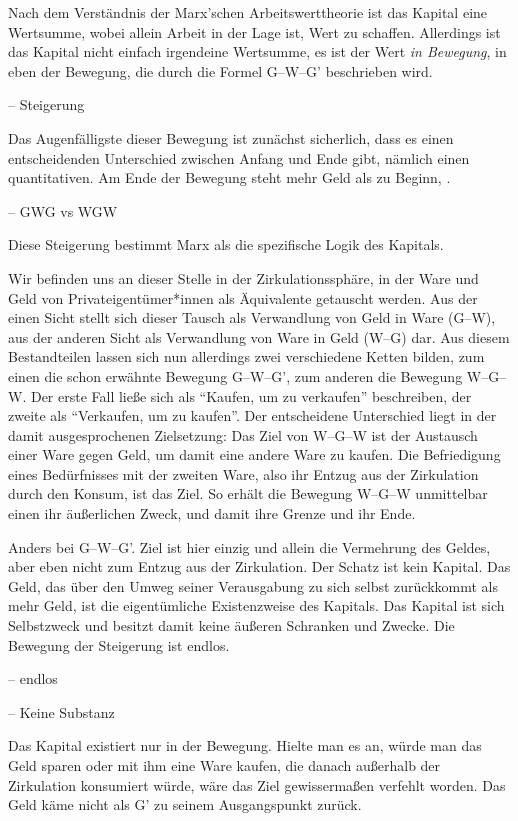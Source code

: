 \documentclass[12pt,
               DIV13,
               paper=a4,
               twoside=false,
               onehalfspacing,
               bibliography=totoc,
               toc=graduated,
               draft,
               ]{scrartcl}
\newcommand{\worries}[1]{\ifdraft{\textcolor{blue}{\texttt{(#1)}}}{}}
\newcommand{\gwg}{G--W--G'\xspace}
\newcommand{\wgw}{W--G--W\xspace}
\begin{document}
Nach dem Verständnis der Marx'schen Arbeitswerttheorie ist das Kapital
eine Wertsumme, wobei allein Arbeit in der Lage ist, Wert zu schaffen.
Allerdings ist das Kapital nicht einfach irgendeine Wertsumme, es ist
der Wert \emph{in Bewegung}, in eben der Bewegung, die durch die Formel
\gwg beschrieben wird.

-- Steigerung

Das Augenfälligste dieser Bewegung ist zunächst sicherlich, dass es
einen entscheidenden Unterschied zwischen Anfang und Ende gibt,
nämlich einen quantitativen. Am Ende der Bewegung steht mehr Geld als
zu Beginn, \worries{sonst "`abgeschmackt"' (Marx)}.

-- GWG vs WGW

Diese Steigerung bestimmt Marx als die spezifische Logik des Kapitals.

Wir befinden uns an dieser Stelle in der Zirkulationssphäre, in der
Ware und Geld von Privateigentümer*innen als Äquivalente getauscht
werden. Aus der einen Sicht stellt sich dieser Tausch als Verwandlung
von Geld in Ware (G--W), aus der anderen Sicht als Verwandlung von
Ware in Geld (W--G) dar. Aus diesem Bestandteilen lassen sich nun
allerdings zwei verschiedene Ketten bilden, zum einen die schon
erwähnte Bewegung \gwg, zum anderen die Bewegung \wgw. Der erste Fall
ließe sich als "`Kaufen, um zu verkaufen"' beschreiben, der zweite als
"`Verkaufen, um zu kaufen"'. Der entscheidene Unterschied liegt in der
damit ausgesprochenen Zielsetzung: Das Ziel von \wgw ist der Austausch
einer Ware gegen Geld, um damit eine andere Ware zu kaufen. Die
Befriedigung eines Bedürfnisses mit der zweiten Ware, also ihr Entzug
aus der Zirkulation durch den Konsum, ist das Ziel. So erhält die
Bewegung \wgw unmittelbar einen ihr äußerlichen Zweck, und damit ihre
Grenze und ihr Ende.

Anders bei \gwg. Ziel ist hier einzig und allein die Vermehrung des
Geldes, aber eben nicht zum Entzug aus der Zirkulation. Der Schatz ist
kein Kapital. Das Geld, das über den Umweg seiner Verausgabung zu sich
selbst zurückkommt als mehr Geld, ist die eigentümliche Existenzweise
des Kapitals. Das Kapital ist sich Selbstzweck und besitzt damit keine
äußeren Schranken und Zwecke. Die Bewegung der Steigerung ist endlos.

-- endlos

-- Keine Substanz

Das Kapital existiert nur in der Bewegung. Hielte man es an, würde man
das Geld sparen oder mit ihm eine Ware kaufen, die danach außerhalb
der Zirkulation konsumiert würde, wäre das Ziel gewissermaßen verfehlt
worden. Das Geld käme nicht als G' zu seinem Ausgangspunkt zurück.
\end{document}
